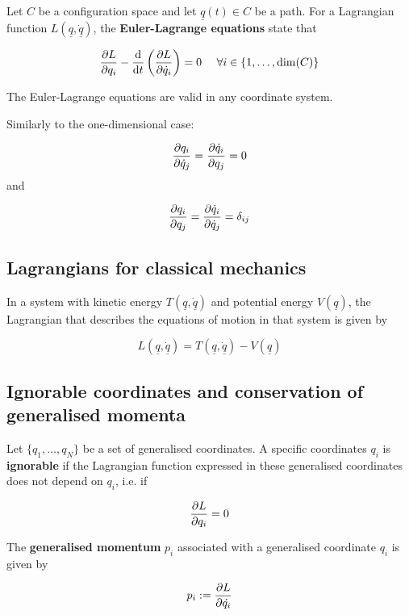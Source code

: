 \begin{definition}
	Let $C$ be a configuration space and let $\underline{q}(t) \in C$ be a path. For a Lagrangian function $L(\underline{q}, \underline{\dot{q}})$, the \textbf{Euler-Lagrange equations} state that

	\[ \diffp{L}{q_i} - \diff{}{t} \left( \diffp{L}{\dot{q}_i} \right) = 0 \quad \forall i \in \{ 1, \dots, \dim(C) \} \]
\end{definition}

\begin{remark}
	The Euler-Lagrange equations are valid in any coordinate system.
\end{remark}

\begin{remark}
	Similarly to the one-dimensional case:

	\[ \diffp{q_i}{\dot{q}_j} = \diffp{\dot{q}_i}{q_j} = 0 \]
	and

	\[ \diffp{q_i}{q_j} = \diffp{\dot{q}_i}{\dot{q}_j} = \delta_{ij} \]
\end{remark}

\subsection{Lagrangians for classical mechanics}

\begin{definition}
	In a system with kinetic energy $T(\underline{q}, \underline{\dot{q}})$ and potential energy $V(\underline{q})$, the Lagrangian that describes the equations of motion in that system is given by

	\[ L(\underline{q}, \underline{\dot{q}}) = T(\underline{q}, \underline{\dot{q}}) - V(\underline{q}) \]
\end{definition}

\subsection{Ignorable coordinates and conservation of generalised momenta}

\begin{definition}
	Let $\{ q_1, \dots, q_N \}$ be a set of generalised coordinates. A specific coordinates $q_i$ is \textbf{ignorable} if the Lagrangian function expressed in these generalised coordinates does not depend on $q_i$, i.e. if

	\[ \diffp{L}{q_i} = 0 \]
\end{definition}

\begin{definition}
	The \textbf{generalised momentum} $p_i$ associated with a generalised coordinate $q_i$ is given by

	\[ p_i := \diffp{L}{\dot{q_i}} \]
\end{definition}

